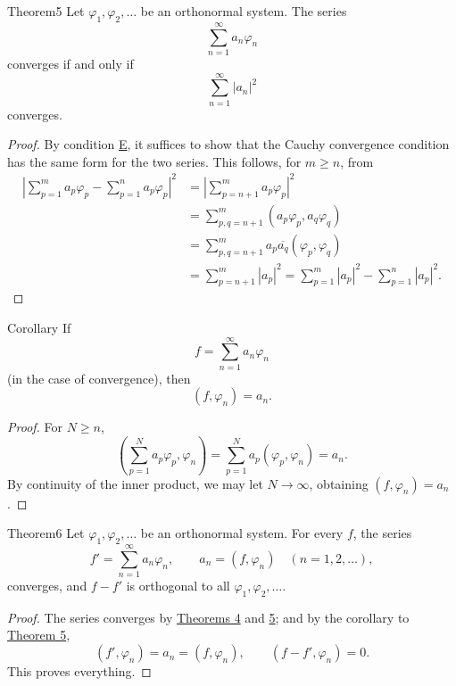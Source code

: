﻿\documentclass[paper=b5,fontsize=13pt,bookmarkpackage=false,twoside]{scrartcl}
\newcounter{translatornote}
\begin{document}
\begin{namedstatement}{Theorem}{5}\label{thm:5}
Let $\varphi_1,\varphi_2,\ldots$ be an orthonormal system. The series
\[
 \sum_{n=1}^{\infty}a_n\varphi_n
\]
converges if and only if
\[
 \sum_{n=1}^{\infty}|a_n|^2
\]
converges.
\end{namedstatement}

\begin{proof}
By condition \hyperref[axiom:E]{E}, it suffices to show that the Cauchy convergence condition has the same form for the two series. This follows, for $m\ge n$, from
\begin{align*}
 \left|
 \sum_{p=1}^{m}a_p\varphi_p
 -
 \sum_{p=1}^{n}a_p\varphi_p
 \right|^2
 &=
 \left|\sum_{p=n+1}^{m}a_p\varphi_p\right|^2\\
 &=
 \sum_{p,q=n+1}^{m}(a_p\varphi_p,a_q\varphi_q)\\
 &=
 \sum_{p,q=n+1}^{m}a_p\overline{a_q}(\varphi_p,\varphi_q)\\
 &=
 \sum_{p=n+1}^{m}|a_p|^2
 =
 \sum_{p=1}^{m}|a_p|^2-\sum_{p=1}^{n}|a_p|^2.
\end{align*}
\end{proof}

\begin{namedstatement}{Corollary}{}\label{cor:thm5}
If
\[
 f=\sum_{n=1}^{\infty}a_n\varphi_n
\]
(in the case of convergence), then
\[
 (f,\varphi_n)=a_n.
\]
\end{namedstatement}

\begin{proof}
For $N\ge n$,
\[
 \left(\sum_{p=1}^{N}a_p\varphi_p,\varphi_n\right)
 =
 \sum_{p=1}^{N}a_p(\varphi_p,\varphi_n)
 =a_n.
\]
By continuity of the inner product, we may let $N\to\infty$, obtaining $(f,\varphi_n)=a_n$.
\end{proof}

\begin{namedstatement}{Theorem}{6}\label{thm:6}
Let $\varphi_1,\varphi_2,\ldots$ be an orthonormal system. For every $f$, the series
\[
 f'=\sum_{n=1}^{\infty}a_n\varphi_n,
 \qquad
 a_n=(f,\varphi_n)
 \quad(n=1,2,\ldots),
\]
converges, and $f-f'$ is orthogonal to all $\varphi_1,\varphi_2,\ldots$.
\end{namedstatement}

\begin{proof}
The series converges by \hyperref[thm:4]{Theorems 4} and \hyperref[thm:5]{5}; and by the corollary to \hyperref[thm:5]{Theorem 5},
\[
 (f',\varphi_n)=a_n=(f,\varphi_n),
 \qquad
 (f-f',\varphi_n)=0.
\]
This proves everything.
\end{proof}
\end{document}
